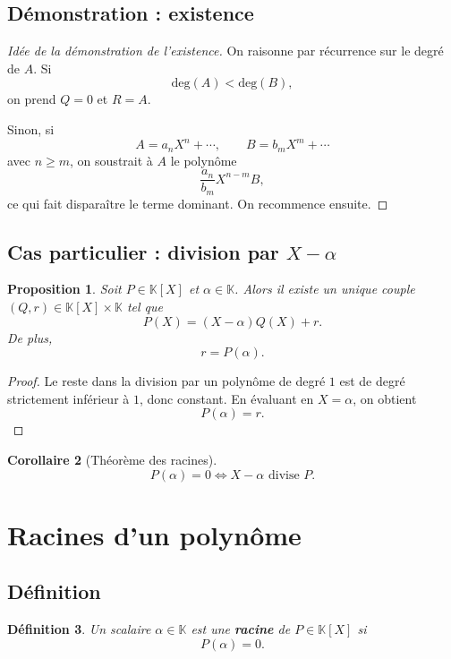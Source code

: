 \documentclass[11pt,a4paper]{article}
\newtheorem{definition}{Définition}[section]
\newtheorem{proposition}[definition]{Proposition}
\newtheorem{corollaire}[definition]{Corollaire}
\theoremstyle{remark}
\newcommand{\K}{\mathbb{K}}
\newcommand{\degP}{\mathrm{deg}}
\begin{document}
\subsection{Démonstration : existence}

\begin{proof}[Idée de la démonstration de l’existence]
On raisonne par récurrence sur le degré de \(A\).  
Si
\[
\degP(A)<\degP(B),
\]
on prend \(Q=0\) et \(R=A\).

Sinon, si
\[
A=a_nX^n+\cdots,\qquad B=b_mX^m+\cdots
\]
avec \(n\ge m\), on soustrait à \(A\) le polynôme
\[
\frac{a_n}{b_m}X^{n-m}B,
\]
ce qui fait disparaître le terme dominant. On recommence ensuite.
\end{proof}

\subsection{Cas particulier : division par \(X-\alpha\)}

\begin{proposition}
Soit \(P\in\K[X]\) et \(\alpha\in\K\). Alors il existe un unique couple \((Q,r)\in\K[X]\times \K\) tel que
\[
P(X)=(X-\alpha)Q(X)+r.
\]
De plus,
\[
r=P(\alpha).
\]
\end{proposition}

\begin{proof}
Le reste dans la division par un polynôme de degré \(1\) est de degré strictement inférieur à \(1\), donc constant. En évaluant en \(X=\alpha\), on obtient
\[
P(\alpha)=r.
\]
\end{proof}

\begin{corollaire}[Théorème des racines]
\[
P(\alpha)=0
\Longleftrightarrow
X-\alpha \text{ divise } P.
\]
\end{corollaire}

\section{Racines d’un polynôme}

\subsection{Définition}

\begin{definition}
Un scalaire \(\alpha\in\K\) est une \textbf{racine} de \(P\in\K[X]\) si
\[
P(\alpha)=0.
\]
\end{definition}
\end{document}
